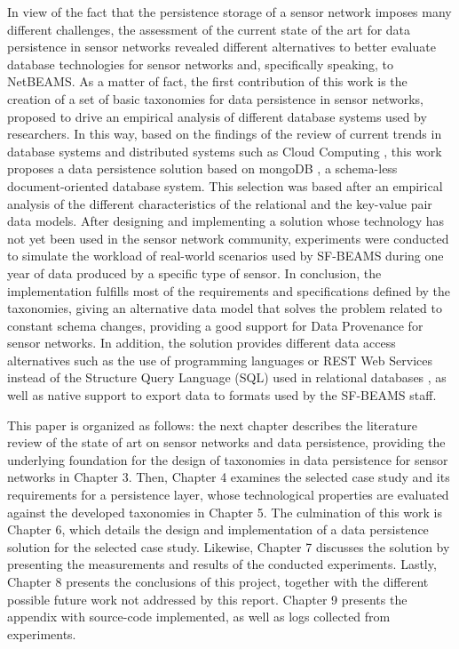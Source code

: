 In view of the fact that the persistence storage of a sensor network imposes
many different challenges, the assessment of the current state of the art for
data persistence in sensor networks revealed different alternatives to better
evaluate database technologies for sensor networks and, specifically speaking,
to NetBEAMS. As a matter of fact, the first contribution of this work is the
creation of a set of basic taxonomies for data persistence in sensor networks,
proposed to drive an empirical analysis of different database systems used by
researchers. In this way, based on the findings of the review of current trends
in database systems \cite{db-is-rdbs-dommed, db-shard-intro} and distributed
systems such as Cloud Computing \cite{cloud-comp-survey}, this work proposes a
data persistence solution based on mongoDB \cite{mongodb}, a schema-less
document-oriented database system. This selection was based after an empirical
analysis of the different characteristics of the relational
\cite{relational-model} and the key-value pair \cite{db-kvp} data models.
After designing and implementing a solution whose technology has not yet been
used in the sensor network community, experiments were conducted to simulate
the workload of real-world scenarios used by SF-BEAMS during one year of data
produced by a specific type of sensor. In conclusion, the implementation
fulfills most of the requirements and specifications defined by the taxonomies,
giving an alternative data model that solves the problem related to constant
schema changes, providing a good support for Data Provenance
\cite{sn-provenance} for sensor networks. In addition, the solution provides
different data access alternatives such as the use of programming languages or
REST Web Services \cite{http-rest} instead of the Structure Query Language (SQL)
\cite{sql} used in relational databases \cite{relational-model}, as well as
native support to export data to formats used by the SF-BEAMS staff.

This paper is organized as follows: the next chapter describes the literature
review of the state of art on sensor networks and data persistence, providing
the underlying foundation for the design of taxonomies in data persistence for
sensor networks in Chapter 3. Then, Chapter 4 examines the selected case study
and its requirements for a persistence layer, whose technological properties are
evaluated against the developed taxonomies in Chapter 5. The culmination of
this work is Chapter 6, which details the design and implementation of a data
persistence solution for the selected case study. Likewise, Chapter 7 discusses
the solution by presenting the measurements and results of the conducted
experiments. Lastly, Chapter 8 presents the conclusions of this
project, together with the different possible future work not addressed by this
report. Chapter 9 presents the appendix with source-code implemented, as well as
logs collected from experiments.
